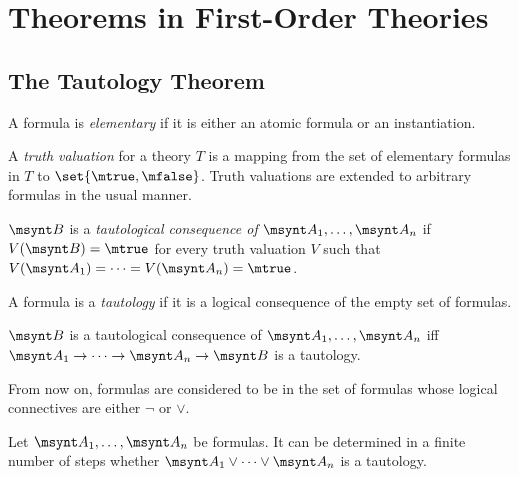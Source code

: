 \section{Theorems in First-Order Theories}

\subsection{The Tautology Theorem}

\begin{definition}
	A formula is \emph{elementary} if it is either an atomic formula or an
	instantiation.
\end{definition}

\begin{definition}
	A \emph{truth valuation} for a theory $T$ is a mapping 
	from the set of elementary formulas in $T$ to $\set{\mtrue, \mfalse}$.
	Truth valuations are extended to arbitrary formulas in the usual
	manner.
\end{definition}

\begin{definition}
	$\msynt B$ is a \emph{tautological consequence of} $\msynt A_1, \dots, \msynt A_n$
	if $V(\msynt B)=\mtrue$ for every truth valuation $V$ such that
	$V(\msynt A_1) = \dots = V(\msynt A_n) = \mtrue$.
\end{definition}

\begin{definition}[Tautology]
	A formula is a \emph{tautology} if it is a logical consequence of the
	empty set of formulas.
\end{definition}

\begin{fact}
	$\msynt B$ is a tautological consequence of $\msynt A_1, \dots, \msynt A_n$ iff
	$\msynt A_1 \to \dots \to \msynt A_n \to \msynt B$ is a tautology.
\end{fact}

From now on, formulas are considered to be in the set of formulas whose
logical connectives are either $\lnot$ or $\lor$. 

\begin{fact}
	Let $\msynt A_1, \dots, \msynt A_n$ be formulas.
	 It can be determined in a finite number of steps
	whether $\msynt A_1 \lor \dots \lor \msynt A_n$ is a tautology.
\end{fact}

